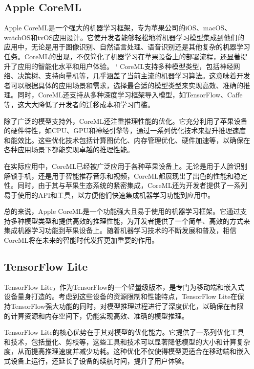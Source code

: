 \subsection{Apple CoreML}

Apple CoreML是一个强大的机器学习框架，专为苹果公司的iOS、macOS、watchOS和tvOS应用设计。它使开发者能够轻松地将机器学习模型集成到他们的应用中，无论是用于图像识别、自然语言处理、语音识别还是其他复杂的机器学习任务。CoreML的出现，不仅简化了机器学习在苹果设备上的部署流程，还显著提升了应用的智能化水平和用户体验。
`
CoreML支持多种模型类型，包括神经网络、决策树、支持向量机等，几乎涵盖了当前主流的机器学习算法。这意味着开发者可以根据具体的应用场景和需求，选择最合适的模型类型来实现高效、准确的推理。同时，CoreML还支持从多种深度学习框架导入模型，如TensorFlow、Caffe等，这大大降低了开发者的迁移成本和学习门槛。

除了广泛的模型支持外，CoreML还注重推理性能的优化。它充分利用了苹果设备的硬件特性，如CPU、GPU和神经引擎等，通过一系列优化技术来提升推理速度和能效比。这些优化技术包括计算图优化、内存管理优化、硬件加速等，以确保在各种应用场景下都能实现卓越的推理性能。

在实际应用中，CoreML已经被广泛应用于各种苹果设备上。无论是用于人脸识别解锁手机，还是用于智能推荐音乐和视频，CoreML都展现出了出色的性能和稳定性。同时，由于其与苹果生态系统的紧密集成，CoreML还为开发者提供了一系列易于使用的API和工具，以方便他们快速集成机器学习功能到应用中。

总的来说，Apple CoreML是一个功能强大且易于使用的机器学习框架。它通过支持多种模型类型和提供高效的推理性能，为开发者提供了一个简单、高效的方式来集成机器学习功能到苹果设备上。随着机器学习技术的不断发展和普及，相信CoreML将在未来的智能时代发挥更加重要的作用。

\subsection{TensorFlow Lite}

TensorFlow Lite，作为TensorFlow的一个轻量级版本，是专门为移动端和嵌入式设备量身打造的。考虑到这些设备的资源限制和性能特点，TensorFlow Lite在保持TensorFlow强大功能的同时，对模型推理过程进行了深度优化，以确保在有限的计算资源和内存空间下，仍能实现高效、准确的模型推理。

TensorFlow Lite的核心优势在于其对模型的优化能力。它提供了一系列优化工具和技术，包括量化、剪枝等，这些工具和技术可以显著降低模型的大小和计算复杂度，从而提高推理速度并减少功耗。这种优化不仅使得模型更适合在移动端和嵌入式设备上运行，还延长了设备的续航时间，提升了用户体验。

